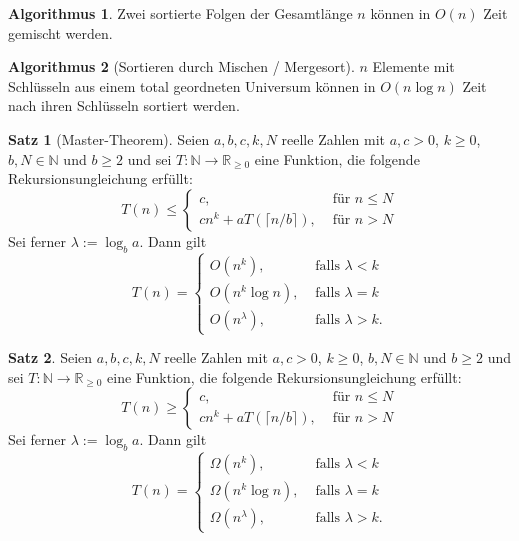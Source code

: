 \documentclass[a4paper,10pt,landscape]{article}
\newcommand{\R}{\mathbb{R}}
\newcommand{\N}{\mathbb{N}}
\theoremstyle{definition}
\newtheorem*{satz}{Satz}
\newtheorem*{alg}{Algorithmus}
\theoremstyle{remark}
\begin{document}
\begin{multicols}{3}

\begin{alg}
  Zwei sortierte Folgen der Gesamtlänge $n$ können in $O(n)$ Zeit gemischt werden.
\end{alg}

\begin{alg}[Sortieren durch Mischen / Mergesort]
  $n$ Elemente mit Schlüsseln aus einem total geordneten Universum können in $O(n \log n)$ Zeit nach ihren Schlüsseln sortiert werden.
\end{alg}

\begin{satz}[Master-Theorem]
  Seien $a, b, c, k, N$ reelle Zahlen mit $a, c > 0$, $k \geq 0$, $b, N \in \N$ und $b \geq 2$ und sei $T : \N \to \R_{\geq 0}$ eine Funktion, die folgende Rekursionsungleichung erfüllt:
  \[ T(n) \leq \begin{cases}
    c, & \text{ für } n \leq N \\
    c n^k + a T(\lceil n / b \rceil), & \text{ für } n > N
  \end{cases} \]
  Sei ferner $\lambda := \log_b a$. Dann gilt
  \[ T(n) = \begin{cases}
    O(n^k), & \text{ falls } \lambda < k \\
    O(n^k \log n), & \text{ falls } \lambda = k \\
    O(n^\lambda), & \text{ falls } \lambda > k.
  \end{cases} \]
\end{satz}

\begin{satz}
  Seien $a, b, c, k, N$ reelle Zahlen mit $a, c > 0$, $k \geq 0$, $b, N \in \N$ und $b \geq 2$ und sei $T : \N \to \R_{\geq 0}$ eine Funktion, die folgende Rekursionsungleichung erfüllt:
  \[ T(n) \geq \begin{cases}
    c, & \text{ für } n \leq N \\
    c n^k + a T(\lceil n / b \rceil), & \text{ für } n > N
  \end{cases} \]
  Sei ferner $\lambda := \log_b a$. Dann gilt
  \[ T(n) = \begin{cases}
    \Omega(n^k), & \text{ falls } \lambda < k \\
    \Omega(n^k \log n), & \text{ falls } \lambda = k \\
    \Omega(n^\lambda), & \text{ falls } \lambda > k.
  \end{cases} \]
\end{satz}


\end{multicols}
\end{document}
